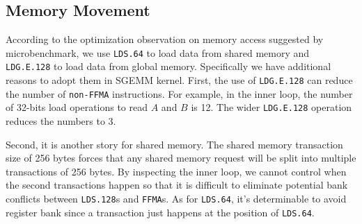 \subsection{Memory Movement}
According to the optimization observation on memory access suggested by microbenchmark, we use {\tt LDS.64} to load data from shared memory and {\tt LDG.E.128} to load data from global memory. Specifically we have additional reasons to adopt them in SGEMM kernel. First, the use of {\tt LDG.E.128} can reduce the number of {\tt non-FFMA} instructions. For example,  in the inner loop, the number of 32-bits load operations to read $A$ and $B$ is 12. The wider {\tt LDG.E.128} operation reduces the numbers to 3.

Second, it is another story for shared memory. The shared memory transaction size of 256 bytes forces that any shared memory request will be split into multiple transactions of 256 bytes. By inspecting the inner loop, we cannot control when the second transactions happen so that it is difficult to eliminate potential bank conflicts between {\tt LDS.128}s and {\tt FFMA}s. As for {\tt LDS.64}, it's determinable to avoid register bank since a transaction just happens at the position of {\tt LDS.64}.

